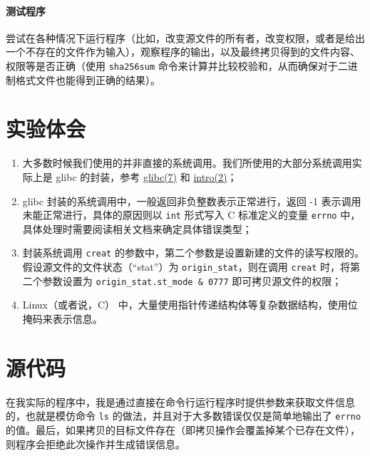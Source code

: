 \documentclass{ctexart}
\begin{document}
    \paragraph{测试程序}

    尝试在各种情况下运行程序（比如，改变源文件的所有者，改变权限，或者是给出一个不存在的文件作为输入），观察程序的输出，以及最终拷贝得到的文件内容、权限等是否正确（使用 \verb|sha256sum| 命令来计算并比较校验和，从而确保对于二进制格式文件也能得到正确的结果）。

    \section{实验体会}

    \begin{enumerate}
        \item 大多数时候我们使用的并非直接的系统调用。我们所使用的大部分系统调用实际上是 glibc 的封装，参考 \href{https://man.archlinux.org/man/glibc.7}{glibc(7)} 和 \href{https://man.archlinux.org/man/intro.2}{intro(2)}；
        \item glibc 封装的系统调用中，一般返回非负整数表示正常进行，返回 -1 表示调用未能正常进行，具体的原因则以 \verb|int| 形式写入 C 标准定义的变量 \verb|errno| 中，具体处理时需要阅读相关文档来确定具体错误类型；
        \item 封装系统调用 \verb|creat| 的参数中，第二个参数是设置新建的文件的读写权限的。假设源文件的文件状态（``stat''）为 \verb|origin_stat|，则在调用 \verb|creat| 时，将第二个参数设置为 \verb|origin_stat.st_mode & 0777| 即可拷贝源文件的权限；
        \item Linux（或者说，C） 中，大量使用指针传递结构体等复杂数据结构，使用位掩码来表示信息。
    \end{enumerate}

    \section{源代码}

    在我实际的程序中，我是通过直接在命令行运行程序时提供参数来获取文件信息的，也就是模仿命令 \verb|ls| 的做法，并且对于大多数错误仅仅是简单地输出了 \verb|errno| 的值。最后，如果拷贝的目标文件存在（即拷贝操作会覆盖掉某个已存在文件），则程序会拒绝此次操作并生成错误信息。
\end{document}
